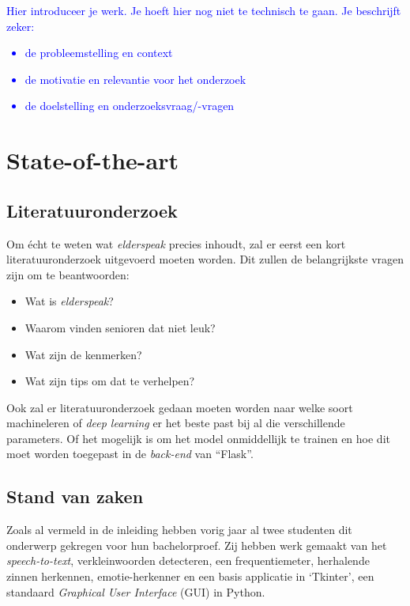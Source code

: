 \textcolor{blue}{Hier introduceer je werk. Je hoeft hier nog niet te technisch te gaan.
Je beschrijft zeker:
\begin{itemize}
  \item de probleemstelling en context
  \item de motivatie en relevantie voor het onderzoek
  \item de doelstelling en onderzoeksvraag/-vragen
\end{itemize}}



\section{State-of-the-art}
\label{sec:state-of-the-art}

\subsection{Literatuuronderzoek}\label{subsec:literatuuronderzoek}

Om écht te weten wat \textit{elderspeak} precies inhoudt, zal er eerst een kort literatuuronderzoek uitgevoerd moeten worden.
Dit zullen de belangrijkste vragen zijn om te beantwoorden:
\begin{itemize}
	\item Wat is \textit{elderspeak}?
	\item Waarom vinden senioren dat niet leuk?
	\item Wat zijn de kenmerken?
	\item Wat zijn tips om dat te verhelpen?
\end{itemize}

Ook zal er literatuuronderzoek gedaan moeten worden naar welke soort machineleren of \textit{deep learning} er het beste past bij al die verschillende parameters.
Of het mogelijk is om het model onmiddellijk te trainen en hoe dit moet worden toegepast in de \textit{back-end} van ``Flask''.

\subsection{Stand van zaken}\label{subsec:stand-van-zaken}

Zoals al vermeld in de inleiding hebben vorig jaar al twee studenten dit onderwerp gekregen voor hun bachelorproef.
Zij hebben werk gemaakt van het \textit{speech-to-text}, verkleinwoorden detecteren, een frequentiemeter, herhalende zinnen herkennen, emotie-herkenner en een basis applicatie in `Tkinter', een standaard \textit{Graphical User Interface} (GUI) in Python.

